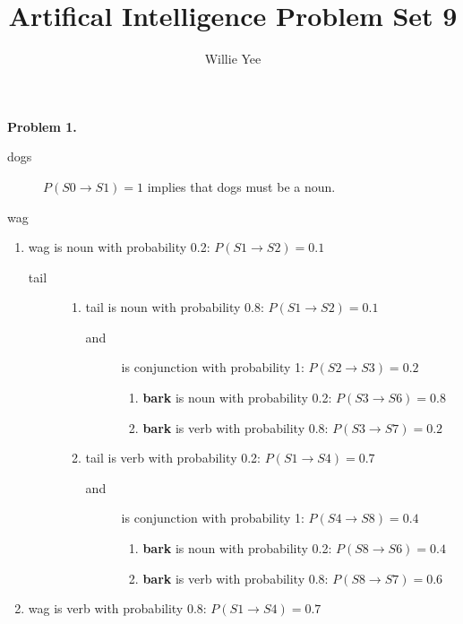 \documentclass{article}
\begin{document}
\title{Artifical Intelligence Problem Set 9}
\date{}
\author{Willie Yee}
\maketitle
\noindent
\textbf{Problem 1.}
\begin{description}
	\item [dogs] $P(S0\rightarrow S1)=1$ implies that dogs must be a noun.
	\item [wag]
\end{description}
\begin{enumerate}
	\item wag is noun with probability 0.2: $P(S1\rightarrow S2)=0.1$
	\begin{description}
		\item [tail] 
		\begin{enumerate}
			\item tail is noun with probability 0.8: $P(S1\rightarrow S2)=0.1$
			\begin{description}
				\item [and] is conjunction with probability 1: $P(S2\rightarrow S3)=0.2$
				\begin{enumerate}
					\item \textbf{bark} is noun with probability 0.2: $P(S3\rightarrow S6)=0.8$
					\item \textbf{bark} is verb with probability 0.8: $P(S3\rightarrow S7)=0.2$
				\end{enumerate}
			\end{description}
			\item tail is verb with probability 0.2: $P(S1\rightarrow S4)=0.7$
			\begin{description}
				\item [and] is conjunction with probability 1: $P(S4\rightarrow S8)=0.4$
				\begin{enumerate}
					\item \textbf{bark} is noun with probability 0.2: $P(S8\rightarrow S6)=0.4$
					\item \textbf{bark} is verb with probability 0.8: $P(S8\rightarrow S7)=0.6$
				\end{enumerate}
			\end{description}
		\end{enumerate}
	\end{description}
	\item wag is verb with probability 0.8: $P(S1\rightarrow S4)=0.7$
	\begin{description}

\end{description}
\end{enumerate}
\end{document}
